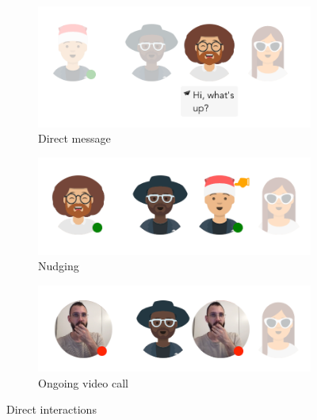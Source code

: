\begin{figure}[h]
    \centering
    \begin{subfigure}{.3\textwidth}
        \centering
        \includegraphics[width=.9\linewidth]{./images/DM.png}
        \caption{Direct message }
        \label{fig:dm}
    \end{subfigure}%
    \begin{subfigure}{.3\textwidth}
        \centering
        \includegraphics[width=.9\linewidth]{./images/nudging.png}
        \caption{Nudging }
        \label{fig:nudging}
    \end{subfigure}
    \begin{subfigure}{.3\textwidth}
        \centering
        \includegraphics[width=.9\linewidth]{./images/call.png}
        \caption{Ongoing video call }
        \label{fig:call}
    \end{subfigure}
    \caption{Direct interactions}
    \label{fig:interaction_results}
\end{figure}